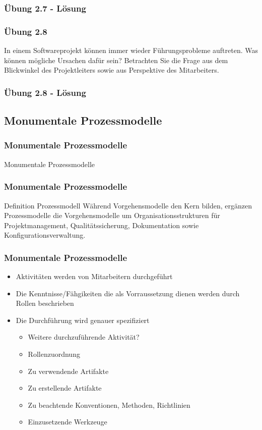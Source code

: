 \ifloesung
\begin{frame}[fragile]
\frametitle{Übung 2.7 - Lösung}
	
\end{frame}
\fi

\begin{frame}
\frametitle{Übung 2.8}
	In einem Softwareprojekt können immer wieder Führungsprobleme auftreten.
	Was können mögliche Ursachen dafür sein? Betrachten Sie die Frage aus dem 
	Blickwinkel des Projektleiters sowie aus Perspektive des Mitarbeiters.
\end{frame}

\ifloesung
\begin{frame}[fragile]
\frametitle{Übung 2.8 - Lösung}
	
\end{frame}
\fi

\subsection{Monumentale Prozessmodelle}
\begin{frame}
\frametitle{Monumentale Prozessmodelle}
\huge Monumentale Prozessmodelle
\end{frame}

\begin{frame}
\frametitle{Monumentale Prozessmodelle}
	\begin{block}{Definition Prozessmodell}
		Während Vorgehensmodelle den Kern bilden, ergänzen Prozessmodelle die Vorgehensmodelle um 
		Organisationsstrukturen für Projektmanagement, Qualitätssicherung, Dokumentation sowie 
		Konfigurationsverwaltung.
	\end{block}
\end{frame}

\begin{frame}
\frametitle{Monumentale Prozessmodelle}
	\begin{itemize}
		\item Aktivitäten werden von Mitarbeitern durchgeführt
		\item Die Kenntnisse/Fähgikeiten die als Vorraussetzung dienen
		werden durch Rollen beschrieben
		\item Die Durchführung wird genauer spezifiziert
		\begin{itemize}
			\item Weitere durchzuführende Aktivität?
			\item Rollenzuordnung
			\item Zu verwendende Artifakte
			\item Zu erstellende Artifakte
			\item Zu beachtende Konventionen, Methoden, Richtlinien
			\item Einzusetzende Werkzeuge
		\end{itemize}
	\end{itemize}
\end{frame}

